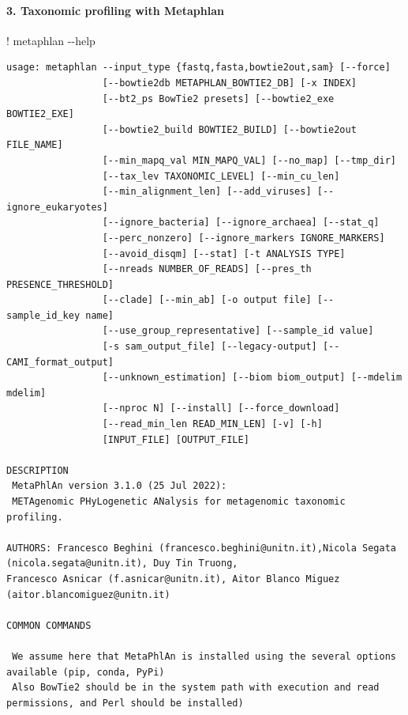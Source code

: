 \documentclass[
  letterpaper,
]{book}
\let\oldparagraph\paragraph
\renewcommand{\paragraph}[1]{\oldparagraph{#1}\mbox{}}
\newenvironment{Shaded}{}{}
\newcommand{\BuiltInTok}[1]{\textcolor[rgb]{0.84,0.23,0.29}{#1}}
\newcommand{\NormalTok}[1]{\textcolor[rgb]{0.14,0.16,0.18}{#1}}
\newcommand{\OperatorTok}[1]{\textcolor[rgb]{0.14,0.16,0.18}{#1}}
\begin{document}
\hypertarget{taxonomic-profiling-with-metaphlan}{%
\paragraph{3. Taxonomic profiling with
Metaphlan}\label{taxonomic-profiling-with-metaphlan}}

\begin{Shaded}
\begin{Highlighting}[]
\OperatorTok{!}\NormalTok{ metaphlan  }\OperatorTok{{-}{-}}\BuiltInTok{help}
\end{Highlighting}
\end{Shaded}

\begin{verbatim}
usage: metaphlan --input_type {fastq,fasta,bowtie2out,sam} [--force]
                 [--bowtie2db METAPHLAN_BOWTIE2_DB] [-x INDEX]
                 [--bt2_ps BowTie2 presets] [--bowtie2_exe BOWTIE2_EXE]
                 [--bowtie2_build BOWTIE2_BUILD] [--bowtie2out FILE_NAME]
                 [--min_mapq_val MIN_MAPQ_VAL] [--no_map] [--tmp_dir]
                 [--tax_lev TAXONOMIC_LEVEL] [--min_cu_len]
                 [--min_alignment_len] [--add_viruses] [--ignore_eukaryotes]
                 [--ignore_bacteria] [--ignore_archaea] [--stat_q]
                 [--perc_nonzero] [--ignore_markers IGNORE_MARKERS]
                 [--avoid_disqm] [--stat] [-t ANALYSIS TYPE]
                 [--nreads NUMBER_OF_READS] [--pres_th PRESENCE_THRESHOLD]
                 [--clade] [--min_ab] [-o output file] [--sample_id_key name]
                 [--use_group_representative] [--sample_id value]
                 [-s sam_output_file] [--legacy-output] [--CAMI_format_output]
                 [--unknown_estimation] [--biom biom_output] [--mdelim mdelim]
                 [--nproc N] [--install] [--force_download]
                 [--read_min_len READ_MIN_LEN] [-v] [-h]
                 [INPUT_FILE] [OUTPUT_FILE]

DESCRIPTION
 MetaPhlAn version 3.1.0 (25 Jul 2022):
 METAgenomic PHyLogenetic ANalysis for metagenomic taxonomic profiling.

AUTHORS: Francesco Beghini (francesco.beghini@unitn.it),Nicola Segata (nicola.segata@unitn.it), Duy Tin Truong,
Francesco Asnicar (f.asnicar@unitn.it), Aitor Blanco Miguez (aitor.blancomiguez@unitn.it)

COMMON COMMANDS

 We assume here that MetaPhlAn is installed using the several options available (pip, conda, PyPi)
 Also BowTie2 should be in the system path with execution and read permissions, and Perl should be installed)


\end{verbatim}
\end{document}
